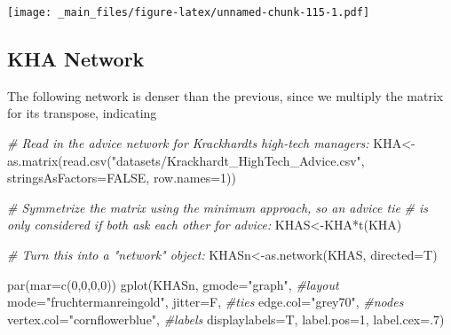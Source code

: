 \documentclass[
  notitlepage,
  onecolumn,
  openany]{book}
\newenvironment{Shaded}{\begin{snugshade}}{\end{snugshade}}
\newcommand{\AttributeTok}[1]{\textcolor[rgb]{0.77,0.63,0.00}{#1}}
\newcommand{\CommentTok}[1]{\textcolor[rgb]{0.56,0.35,0.01}{\textit{#1}}}
\newcommand{\ConstantTok}[1]{\textcolor[rgb]{0.00,0.00,0.00}{#1}}
\newcommand{\DecValTok}[1]{\textcolor[rgb]{0.00,0.00,0.81}{#1}}
\newcommand{\FunctionTok}[1]{\textcolor[rgb]{0.00,0.00,0.00}{#1}}
\newcommand{\NormalTok}[1]{#1}
\newcommand{\OtherTok}[1]{\textcolor[rgb]{0.56,0.35,0.01}{#1}}
\newcommand{\SpecialCharTok}[1]{\textcolor[rgb]{0.00,0.00,0.00}{#1}}
\newcommand{\StringTok}[1]{\textcolor[rgb]{0.31,0.60,0.02}{#1}}
\begin{document}
\texttt{[image: \_main\_files/figure-latex/unnamed-chunk-115-1.pdf]}

\hypertarget{kha-network}{%
\subsection{KHA Network}\label{kha-network}}

The following network is denser than the previous, since we multiply the matrix for its transpose, indicating

\begin{Shaded}
\begin{Highlighting}[]
\CommentTok{\# Read in the advice network for Krackhardt\textquotesingle{}s high{-}tech managers:}
\NormalTok{KHA}\OtherTok{\textless{}{-}}\FunctionTok{as.matrix}\NormalTok{(}\FunctionTok{read.csv}\NormalTok{(}\StringTok{"datasets/Krackhardt\_HighTech\_Advice.csv"}\NormalTok{,}
                        \AttributeTok{stringsAsFactors=}\ConstantTok{FALSE}\NormalTok{, }\AttributeTok{row.names=}\DecValTok{1}\NormalTok{))}

\CommentTok{\# Symmetrize the matrix using the minimum approach, so an advice tie}
\CommentTok{\# is only considered if both ask each other for advice:}
\NormalTok{KHAS}\OtherTok{\textless{}{-}}\NormalTok{KHA}\SpecialCharTok{*}\FunctionTok{t}\NormalTok{(KHA)}

\CommentTok{\# Turn this into a "network" object:}
\NormalTok{KHASn}\OtherTok{\textless{}{-}}\FunctionTok{as.network}\NormalTok{(KHAS, }\AttributeTok{directed=}\NormalTok{T)}

\FunctionTok{par}\NormalTok{(}\AttributeTok{mar=}\FunctionTok{c}\NormalTok{(}\DecValTok{0}\NormalTok{,}\DecValTok{0}\NormalTok{,}\DecValTok{0}\NormalTok{,}\DecValTok{0}\NormalTok{))}
\FunctionTok{gplot}\NormalTok{(KHASn, }
      \AttributeTok{gmode=}\StringTok{"graph"}\NormalTok{,}
      \CommentTok{\#layout}
      \AttributeTok{mode=}\StringTok{"fruchtermanreingold"}\NormalTok{,}
      \AttributeTok{jitter=}\NormalTok{F,}
      \CommentTok{\#ties}
      \AttributeTok{edge.col=}\StringTok{"grey70"}\NormalTok{,}
      \CommentTok{\#nodes}
      \AttributeTok{vertex.col=}\StringTok{"cornflowerblue"}\NormalTok{,}
      \CommentTok{\#labels}
      \AttributeTok{displaylabels=}\NormalTok{T,}
      \AttributeTok{label.pos=}\DecValTok{1}\NormalTok{,}
      \AttributeTok{label.cex=}\NormalTok{.}\DecValTok{7}\NormalTok{)}
\end{Highlighting}
\end{Shaded}
\end{document}
